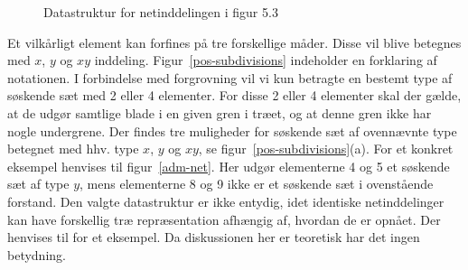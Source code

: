 \begin{figure}[p]
\begin{center}
\begin{bundle}{}
{\begin{bundle}{}
{\begin{bundle}{}
{\begin{bundle}{}
{\begin{bundle}{}
{\begin{bundle}{}
{\begin{bundle}{}
                         \end{bundle}}
                       \end{bundle}} 
                     \end{bundle}}
                  \end{bundle}}
                \end{bundle}}
              \end{bundle}} 
\end{bundle}
\end{center}
\caption{Datastruktur for netinddelingen i figur 5.3\label{datastructur}}
\end{figure}

Et vilkårligt element kan forfines på tre forskellige måder. Disse vil
blive betegnes med $x$, $y$ og $xy$ inddeling.
Figur~\ref{pos-subdivisions} indeholder en forklaring af notationen. I
forbindelse med forgrovning vil vi kun betragte en bestemt type af
søskende sæt med 2 eller 4 elementer. For disse 2 eller 4 elementer
skal der gælde, at de udgør samtlige blade i en given gren i træet, og
at denne gren ikke har nogle undergrene. Der findes tre muligheder
for søskende sæt af ovennævnte type betegnet med hhv. type $x$, $y$ og
$xy$, se figur~\ref{pos-subdivisions}(a). For et konkret eksempel
henvises til figur~\ref{adm-net}. Her udgør elementerne 4 og 5 et
søskende sæt af type $y$, mens elementerne 8 og 9 ikke er et søskende
sæt i ovenstående forstand. Den valgte datastruktur er
ikke entydig, idet identiske netinddelinger kan have forskellig træ
repræsentation afhængig af, hvordan de er opnået. Der henvises til
\cite{hugger-net} for et eksempel. Da diskussionen her er teoretisk har det
ingen  betydning. 
